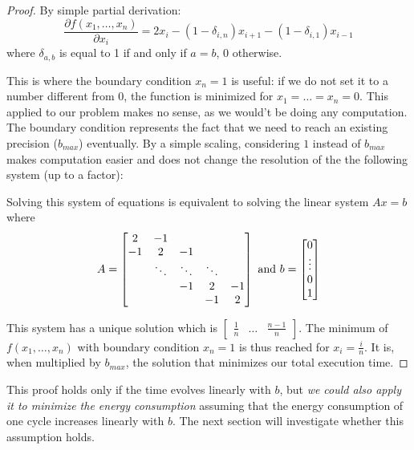 \begin{proof}
    By simple partial derivation: \[ \frac{\partial f(x_1,\dots,x_n)}{\partial
    x_i} = 2x_i - (1-\delta_{i,n})x_{i+1} - (1-\delta_{i,1})x_{i-1} \] where
    $\delta_{a,b} $ is equal to 1 if and only if $a=b$, 0 otherwise.

    This is where the boundary condition $x_n = 1$ is useful: if we do not set it
    to a number different from 0, the function is minimized for
    $x_1=\dots=x_n=0$. This applied to our problem makes no sense, as we
    would't be doing any computation. The boundary condition represents the
    fact that we need to reach an existing precision ($b_{max}$) eventually. By
    a simple scaling, considering $1$ instead of $b_{max}$ makes computation
    easier and does not change the resolution of the the following system (up
    to a factor):


    Solving this system of equations is equivalent to solving the linear system $Ax=b$ where
    \[ A =
    \begin{bmatrix}
    2       & -1 &  &  &  \\
    -1       & 2 & -1 &  &  \\
    & \ddots & \ddots & \ddots & \\
    & & -1 & 2 & -1 \\
           &  &  & -1 & 2
    \end{bmatrix}
    \textup{ and } b = \begin{bmatrix} 0 \\ \vdots \\ 0 \\ 1 \end{bmatrix} \]

    This system has a unique solution which is $\begin{bmatrix} \frac{1}{n} & \dots
    & \frac{n-1}{n} \end{bmatrix}$.  The minimum of $f(x_1,\dots,x_n)$ with
    boundary condition $x_n=1$ is thus reached for $x_i = \frac{i}{n}$.  It
    is, when multiplied by $b_{max}$, the solution that minimizes our total
    execution time.

\end{proof}

   This proof holds only if the time evolves linearly with $b$, but \textit{we
   could also apply it to minimize the energy consumption} assuming that the
   energy consumption of one cycle increases linearly with $b$. The next
   section will investigate whether this assumption holds.

